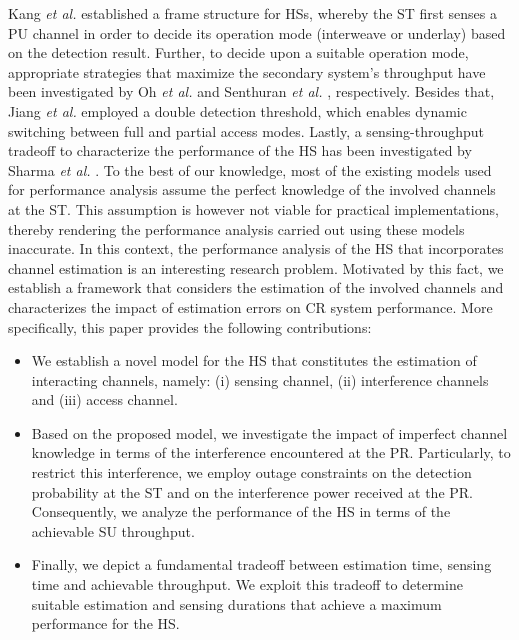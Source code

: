 Kang \textit{et al.} \cite{Kang09} established a frame structure for HSs, whereby the ST first senses a PU channel in order to decide its operation mode (interweave or underlay) based on the detection result. Further, to decide upon a suitable operation mode, appropriate strategies that maximize the secondary system's throughput have been investigated by Oh \textit{et al.} \cite{Oh10} and Senthuran \textit{et al.} \cite{Senthu12}, respectively. Besides that, Jiang \textit{et al.} employed a double detection threshold, which enables dynamic switching between full and partial access modes. Lastly, a sensing-throughput tradeoff to characterize the performance of the HS has been investigated by Sharma \textit{et al.} \cite{Sharma14}. 
To the best of our knowledge, most of the existing models used for performance analysis assume the perfect knowledge of the involved channels at the ST. This assumption is however not viable for practical implementations, thereby rendering the performance analysis carried out using these models inaccurate. In this context, the performance analysis of the HS that incorporates channel estimation is an interesting research problem. Motivated by this fact, we establish a framework that considers the estimation of the involved channels and characterizes the impact of estimation errors on CR system performance.
More specifically, this paper provides the following contributions:
\begin{itemize}
\item 
We establish a novel model for the HS that constitutes the estimation of interacting channels, namely: (i) sensing channel, (ii) interference channels and (iii) access channel.
\item
Based on the proposed model, we investigate the impact of imperfect channel knowledge in terms of the interference encountered at the PR. Particularly, to restrict this interference, we employ outage constraints on the detection probability at the ST and on the interference power received at the PR. Consequently, we analyze the performance of the HS in terms of the achievable SU throughput.
\item 
Finally, we depict a fundamental tradeoff between estimation time, sensing time and achievable throughput. We exploit this tradeoff to determine suitable estimation and sensing durations that achieve a maximum performance for the HS. 
\end{itemize}

